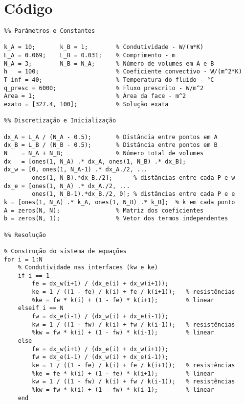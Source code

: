 \section{Código}

\begin{verbatim}
%% Parâmetros e Constantes

k_A = 10;       k_B = 1;        % Condutividade - W/(m*K)
L_A = 0.069;    L_B = 0.031;    % Comprimento - m
N_A = 3;        N_B = N_A;      % Número de volumes em A e B
h   = 100;                      % Coeficiente convectivo - W/(m^2*K)
T_inf = 40;                     % Temperatura do fluido - °C
q_presc = 6000;                 % Fluxo prescrito - W/m^2
Area = 1;                       % Área da face - m^2
exato = [327.4, 100];           % Solução exata

%% Discretização e Inicialização

dx_A = L_A / (N_A - 0.5);       % Distância entre pontos em A
dx_B = L_B / (N_B - 0.5);       % Distância entre pontos em B
N    = N_A + N_B;               % Número total de volumes
dx   = [ones(1, N_A) .* dx_A, ones(1, N_B) .* dx_B];
dx_w = [0, ones(1, N_A-1) .* dx_A./2, ...
        ones(1, N_B).*dx_B./2];      % distâncias entre cada P e w
dx_e = [ones(1, N_A) .* dx_A./2, ...
        ones(1, N_B-1).*dx_B./2, 0]; % distâncias entre cada P e e
k = [ones(1, N_A) .* k_A, ones(1, N_B) .* k_B];  % k em cada ponto
A = zeros(N, N);                % Matriz dos coeficientes
b = zeros(N, 1);                % Vetor dos termos independentes

%% Resolução

% Construção do sistema de equações
for i = 1:N
    % Condutividade nas interfaces (kw e ke)
    if i == 1
        fe = dx_w(i+1) / (dx_e(i) + dx_w(i+1));
        ke = 1 / ((1 - fe) / k(i) + fe / k(i+1));   % resistências
        %ke = fe * k(i) + (1 - fe) * k(i+1);        % linear
    elseif i == N
        fw = dx_e(i-1) / (dx_w(i) + dx_e(i-1));
        kw = 1 / ((1 - fw) / k(i) + fw / k(i-1));   % resistências
        %kw = fw * k(i) + (1 - fw) * k(i-1);        % linear
    else
        fe = dx_w(i+1) / (dx_e(i) + dx_w(i+1));
        fw = dx_e(i-1) / (dx_w(i) + dx_e(i-1));
        ke = 1 / ((1 - fe) / k(i) + fe / k(i+1));   % resistências
        %ke = fe * k(i) + (1 - fe) * k(i+1);        % linear
        kw = 1 / ((1 - fw) / k(i) + fw / k(i-1));   % resistências
        %kw = fw * k(i) + (1 - fw) * k(i-1);        % linear
    end
 

\end{verbatim}
